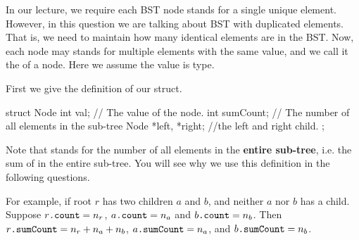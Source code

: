 
In our lecture, we require each BST node stands for a single unique element. However, in this question we are talking about BST with duplicated elements. That is, we need to maintain how many identical elements are in the BST. Now, each node may stands for multiple elements with the same value, and we call it the  of a node. Here we assume the value is  type.

First we give the definition of our  struct.

\begin{cpp}
    struct Node {
            int val;    // The value of the node.
            int sumCount;    // The number of all elements in the sub-tree
            Node *left, *right; //the left and right child.
        };
\end{cpp}

Note that  stands for the number of all elements in the \textbf{entire sub-tree}, i.e. the sum of  in the entire sub-tree. You will see why we use this definition in the following questions.

For example, if root $r$ has two children $a$ and $b$, and neither $a$ nor $b$ has a child. Suppose $r\texttt{.count}=n_r$, $a\texttt{.count}=n_a$ and $b\texttt{.count}=n_b$. Then $r\texttt{.sumCount}=n_r+n_a+n_b$, $a\texttt{.sumCount}=n_a$, and $b\texttt{.sumCount}=n_b$.

